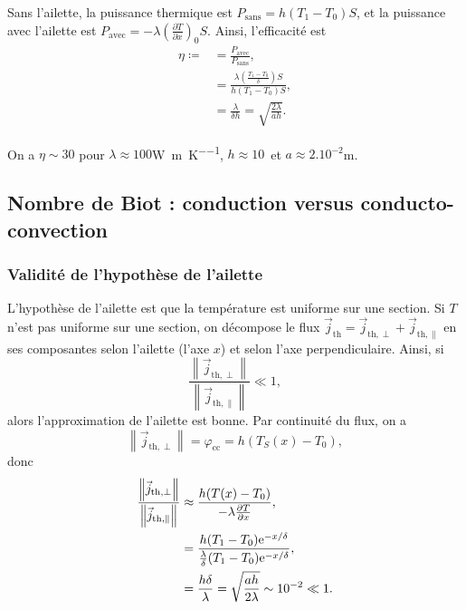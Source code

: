             Sans l'ailette, la puissance thermique est $P_{\text{sans}}=h(T_1-T_0)S$, et la puissance avec l'ailette est $P_{\text{avec}}=-\lambda\left(\frac{\partial T}{\partial x}\right)_{0}S$. Ainsi, l'efficacité est 
            \begin{align*}
                \eta\coloneqq
                &=
                \frac{P_{\text{avec}}}{P_{\text{sans}}},\\
                &=
                \frac{\lambda\left(\frac{T_1-T_0}{\delta}\right)S}{h(T_1-T_0)S},\\
                &=
                \frac{\lambda}{\delta h}=\sqrt{\frac{2\lambda}{ah}}.
            \end{align*}

            On a $\eta\sim 30$ pour $\lambda\approx100$\si[]{\watt\per\metre\per\kelvin}, $h\approx10$\si[]{\watt\per\metre\square} et $a\approx2.10^{-2}$\si[]{\metre}.

    \subsection{Nombre de Biot : conduction versus conducto-convection}
        \subsubsection{Validité de l'hypothèse de l'ailette}
            L'hypothèse de l'ailette est que la température est uniforme sur une section. Si $T$ n'est pas uniforme sur une section, on décompose le flux $\vec{j}_{\text{th}}=\vec{j}_{\text{th},\perp}+\vec{j}_{\text{th},\parallel}$ en ses composantes selon l'ailette (l'axe $x$) et selon l'axe perpendiculaire. Ainsi, si 
            \begin{equation*}
                \frac{\left\lVert\vec{j}_{\text{th},\perp}\right\rVert}{\left\lVert\vec{j}_{\text{th},\parallel}\right\rVert}\ll1,
            \end{equation*}
            alors l'approximation de l'ailette est bonne. Par continuité du flux, on a 
            \begin{equation*}
                \left\lVert\vec{j}_{\text{th},\perp}\right\rVert=\varphi_{\text{cc}}=h(T_S(x)-T_0),
            \end{equation*}
            donc
            \begin{align*}
                \frac{\left\lVert\vec{j}_{\text{th},\perp}\right\rVert}{\left\lVert\vec{j}_{\text{th},\parallel}\right\rVert}
                &\approx
                \frac{h(T(x)-T_0)}{-\lambda\frac{\partial T}{\partial x}},\\
                &=
                \frac{h(T_1-T_0)\mathrm{e}^{-x/\delta}}{\frac{\lambda}{\delta}(T_1-T_0)\mathrm{e}^{-x/\delta}},\\
                &=
                \frac{h\delta}{\lambda}=\sqrt{\frac{ah}{2\lambda}}\sim10^{-2}\ll1.
            \end{align*}

